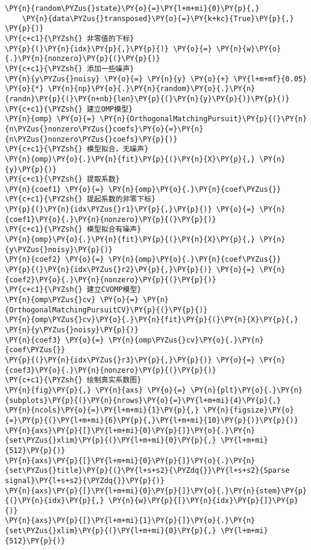 \begin{Verbatim}[commandchars=\\\{\}]
    \PY{n}{random\PYZus{}state}\PY{o}{=}\PY{l+m+mi}{0}\PY{p}{,}
    \PY{n}{data\PYZus{}transposed}\PY{o}{=}\PY{k+kc}{True}\PY{p}{,}
\PY{p}{)}
\PY{c+c1}{\PYZsh{} 非零值的下标}
\PY{p}{(}\PY{n}{idx}\PY{p}{,}\PY{p}{)} \PY{o}{=} \PY{n}{w}\PY{o}{.}\PY{n}{nonzero}\PY{p}{(}\PY{p}{)}
\PY{c+c1}{\PYZsh{} 添加一些噪声}
\PY{n}{y\PYZus{}noisy} \PY{o}{=} \PY{n}{y} \PY{o}{+} \PY{l+m+mf}{0.05} \PY{o}{*} \PY{n}{np}\PY{o}{.}\PY{n}{random}\PY{o}{.}\PY{n}{randn}\PY{p}{(}\PY{n+nb}{len}\PY{p}{(}\PY{n}{y}\PY{p}{)}\PY{p}{)}
\PY{c+c1}{\PYZsh{} 建立OMP模型}
\PY{n}{omp} \PY{o}{=} \PY{n}{OrthogonalMatchingPursuit}\PY{p}{(}\PY{n}{n\PYZus{}nonzero\PYZus{}coefs}\PY{o}{=}\PY{n}{n\PYZus{}nonzero\PYZus{}coefs}\PY{p}{)}
\PY{c+c1}{\PYZsh{} 模型拟合，无噪声}
\PY{n}{omp}\PY{o}{.}\PY{n}{fit}\PY{p}{(}\PY{n}{X}\PY{p}{,} \PY{n}{y}\PY{p}{)}
\PY{c+c1}{\PYZsh{} 提取系数}
\PY{n}{coef1} \PY{o}{=} \PY{n}{omp}\PY{o}{.}\PY{n}{coef\PYZus{}}
\PY{c+c1}{\PYZsh{} 提起系数的非零下标}
\PY{p}{(}\PY{n}{idx\PYZus{}r1}\PY{p}{,}\PY{p}{)} \PY{o}{=} \PY{n}{coef1}\PY{o}{.}\PY{n}{nonzero}\PY{p}{(}\PY{p}{)}
\PY{c+c1}{\PYZsh{} 模型拟合有噪声}
\PY{n}{omp}\PY{o}{.}\PY{n}{fit}\PY{p}{(}\PY{n}{X}\PY{p}{,} \PY{n}{y\PYZus{}noisy}\PY{p}{)}
\PY{n}{coef2} \PY{o}{=} \PY{n}{omp}\PY{o}{.}\PY{n}{coef\PYZus{}}
\PY{p}{(}\PY{n}{idx\PYZus{}r2}\PY{p}{,}\PY{p}{)} \PY{o}{=} \PY{n}{coef2}\PY{o}{.}\PY{n}{nonzero}\PY{p}{(}\PY{p}{)}
\PY{c+c1}{\PYZsh{} 建立CVOMP模型}
\PY{n}{omp\PYZus{}cv} \PY{o}{=} \PY{n}{OrthogonalMatchingPursuitCV}\PY{p}{(}\PY{p}{)}
\PY{n}{omp\PYZus{}cv}\PY{o}{.}\PY{n}{fit}\PY{p}{(}\PY{n}{X}\PY{p}{,} \PY{n}{y\PYZus{}noisy}\PY{p}{)}
\PY{n}{coef3} \PY{o}{=} \PY{n}{omp\PYZus{}cv}\PY{o}{.}\PY{n}{coef\PYZus{}}
\PY{p}{(}\PY{n}{idx\PYZus{}r3}\PY{p}{,}\PY{p}{)} \PY{o}{=} \PY{n}{coef3}\PY{o}{.}\PY{n}{nonzero}\PY{p}{(}\PY{p}{)}
\PY{c+c1}{\PYZsh{} 绘制真实系数图}
\PY{n}{fig}\PY{p}{,} \PY{n}{axs} \PY{o}{=} \PY{n}{plt}\PY{o}{.}\PY{n}{subplots}\PY{p}{(}\PY{n}{nrows}\PY{o}{=}\PY{l+m+mi}{4}\PY{p}{,} \PY{n}{ncols}\PY{o}{=}\PY{l+m+mi}{1}\PY{p}{,} \PY{n}{figsize}\PY{o}{=}\PY{p}{(}\PY{l+m+mi}{6}\PY{p}{,}\PY{l+m+mi}{10}\PY{p}{)}\PY{p}{)}
\PY{n}{axs}\PY{p}{[}\PY{l+m+mi}{0}\PY{p}{]}\PY{o}{.}\PY{n}{set\PYZus{}xlim}\PY{p}{(}\PY{l+m+mi}{0}\PY{p}{,} \PY{l+m+mi}{512}\PY{p}{)}
\PY{n}{axs}\PY{p}{[}\PY{l+m+mi}{0}\PY{p}{]}\PY{o}{.}\PY{n}{set\PYZus{}title}\PY{p}{(}\PY{l+s+s2}{\PYZdq{}}\PY{l+s+s2}{Sparse signal}\PY{l+s+s2}{\PYZdq{}}\PY{p}{)}
\PY{n}{axs}\PY{p}{[}\PY{l+m+mi}{0}\PY{p}{]}\PY{o}{.}\PY{n}{stem}\PY{p}{(}\PY{n}{idx}\PY{p}{,} \PY{n}{w}\PY{p}{[}\PY{n}{idx}\PY{p}{]}\PY{p}{)}
\PY{n}{axs}\PY{p}{[}\PY{l+m+mi}{1}\PY{p}{]}\PY{o}{.}\PY{n}{set\PYZus{}xlim}\PY{p}{(}\PY{l+m+mi}{0}\PY{p}{,} \PY{l+m+mi}{512}\PY{p}{)}

\end{Verbatim}
